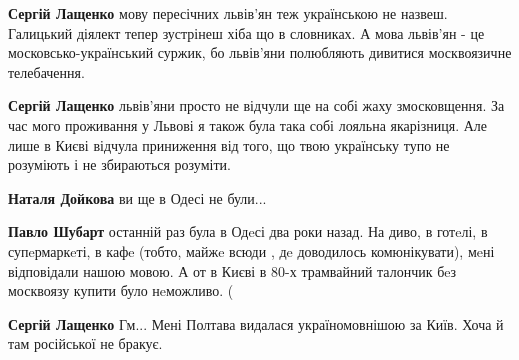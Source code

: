 \begin{itemize}
\begin{itemize}
 
\textbf{Сергій Лащенко} мову пересічних львів'ян теж українською не назвеш. Галицький діялект тепер зустрінеш хіба що в словниках. А мова львів'ян - це московсько-український суржик, бо львів'яни полюбляють дивитися москвоязичне телебачення.

 
\textbf{Сергій Лащенко} львів'яни просто не відчули ще на собі жаху змосковщення. За час мого проживання у Львові я також була така собі лояльна якарізниця. Але лише в Києві відчула приниження від того, що твою українську тупо не розуміють і не збираються розуміти.

 
\textbf{Наталя Дойкова} ви ще в Одесі не були...

 
\textbf{Павло Шубарт} останній раз була в Одeсі два роки назад. На диво, в
готeлі, в супeрмаркeті, в кафe (тобто, майжe всюди , дe доводилось
комюнікувати), мeні відповідали нашою мовою. А от в Києві в 80-х трамвайний
талончик бeз москвоязу купити було нeможливо. (

 
\textbf{Сергій Лащенко} Гм... Мені Полтава видалася україномовнішою за Київ. Хоча й там російської не бракує.


\end{itemize}
\end{itemize}

